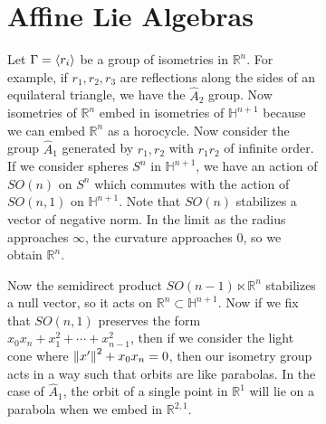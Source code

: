 \documentclass[leqno, openany]{memoir}
\theoremstyle{definition}
\theoremstyle{remark}
\theoremstyle{plain}
\theoremstyle{definition}
\theoremstyle{remark}
\newcommand{\R}{\mathbb{R}}
\renewcommand{\H}{\mathbb{H}}
\newcommand{\wh}[1]{\widehat{#1}}
\begin{document}
\begin{figure}[H]
\begin{figure}[H]
\section{Affine Lie Algebras}%

Let $\Gamma = \ev{r_i}$ be a group of isometries in $\R^n$. For example, if
$r_1, r_2, r_3$ are reflections along the sides of an equilateral triangle, we
have the $\wh{A}_2$ group. Now isometries of $\R^n$ embed in isometries of
$\H^{n+1}$ because we can embed $\R^n$ as a horocycle. Now consider the group
$\wh{A}_1$ generated by $r_1, r_2$ with $r_1 r_2$ of infinite order. If we
consider spheres $S^n$ in $\H^{n+1}$, we have an action of $SO(n)$ on $S^n$
which commutes with the action of $SO(n,1)$ on $\H^{n+1}$. Note that $SO(n)$
stabilizes a vector of negative norm. In the limit as the radius approaches
$\infty$, the curvature approaches $0$, so we obtain $\R^n$.

Now the semidirect product $SO(n-1) \ltimes \R^n$ stabilizes a null vector, so
it acts on $\R^n \subset \H^{n+1}$. Now if we fix that $SO(n,1)$ preserves the
form $x_0 x_n + x_1^2 + \cdots + x_{n-1}^2$, then if we consider the light cone
where $\norm{x'}^2 + x_0 x_n = 0$, then our isometry group acts in a way such
that orbits are like parabolas. In the case of $\wh{A}_1$, the orbit of a
single point in $\R^1$ will lie on a parabola when we embed in $\R^{2,1}$.


\end{figure}
\end{figure}
\end{document}
